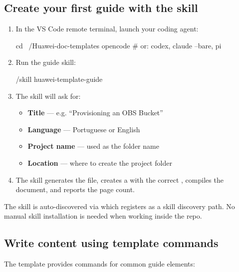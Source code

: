 \documentclass[english]{guide}
\begin{document}
\subsection{Create your first guide with the skill}

\passoapasso
\begin{enumerate}
  \item In the VS Code remote terminal, launch your coding agent:

  \begin{codigo}[bash]
cd ~/Huawei-doc-templates
opencode          # or: codex, claude --bare, pi
  \end{codigo}

  \item Run the guide skill:

  \begin{codigo}
/skill huawei-template-guide
  \end{codigo}

  \item The skill will ask for:
    \begin{itemize}
      \item \textbf{Title} — e.g. ``Provisioning an OBS Bucket''
      \item \textbf{Language} — Portuguese or English
      \item \textbf{Project name} — used as the folder name
      \item \textbf{Location} — where to create the project folder
    \end{itemize}

  \item The skill generates the  file, creates a
         with the correct , compiles the
        document, and reports the page count.

\end{enumerate}

\begin{infobox}
The skill is auto-discovered via  which registers
 as a skill discovery path. No manual skill installation
is needed when working inside the repo.
\end{infobox}

\subsection{Write content using template commands}

The template provides commands for common guide elements:
\end{document}
